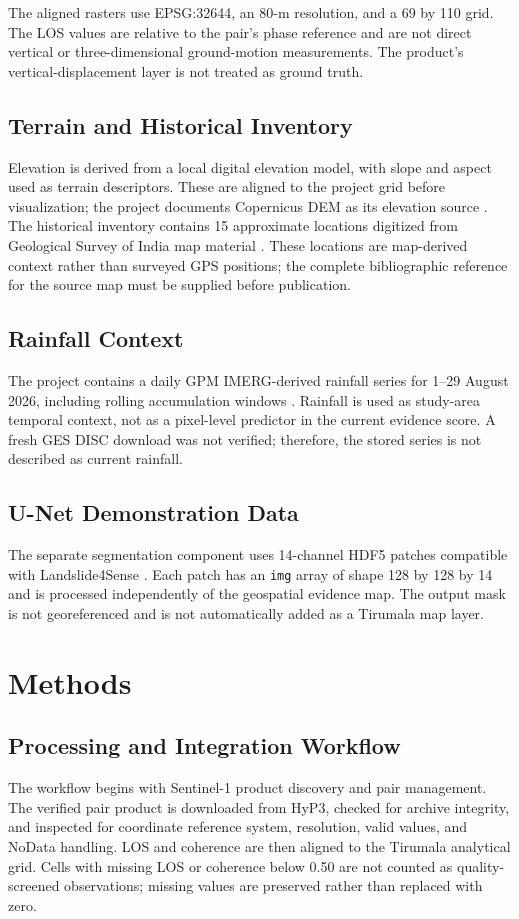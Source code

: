 \documentclass[conference]{IEEEtran}
\begin{document}
The aligned rasters use EPSG:32644, an 80-m resolution, and a 69 by 110 grid.
The LOS values are relative to the pair's phase reference and are not direct
vertical or three-dimensional ground-motion measurements. The product's
vertical-displacement layer is not treated as ground truth.

\subsection{Terrain and Historical Inventory}
Elevation is derived from a local digital elevation model, with slope and
aspect used as terrain descriptors. These are aligned to the project grid
before visualization; the project documents Copernicus DEM as its elevation
source \cite{copdem}. The historical inventory contains 15 approximate
locations digitized from Geological Survey of India map material \cite{gsi}. These
locations are map-derived context rather than surveyed GPS positions; the
complete bibliographic reference for the source map must be supplied before
publication.

\subsection{Rainfall Context}
The project contains a daily GPM IMERG-derived rainfall series for
1--29 August 2026, including rolling accumulation windows \cite{imerg}.
Rainfall is used as study-area temporal context, not as a pixel-level
predictor in the current evidence score. A fresh GES DISC download was not
verified; therefore, the stored series is not described as current rainfall.

\subsection{U-Net Demonstration Data}
The separate segmentation component uses 14-channel HDF5 patches compatible
with Landslide4Sense \cite{l4s}. Each patch has an \texttt{img} array of shape
128 by 128 by 14 and is processed independently of the geospatial evidence
map. The output mask is not georeferenced and is not automatically added as a
Tirumala map layer.

\section{Methods}
\subsection{Processing and Integration Workflow}
The workflow begins with Sentinel-1 product discovery and pair management.
The verified pair product is downloaded from HyP3, checked for archive
integrity, and inspected for coordinate reference system, resolution, valid
values, and NoData handling. LOS and coherence are then aligned to the
Tirumala analytical grid. Cells with missing LOS or coherence below 0.50 are
not counted as quality-screened observations; missing values are preserved
rather than replaced with zero.
\end{document}
